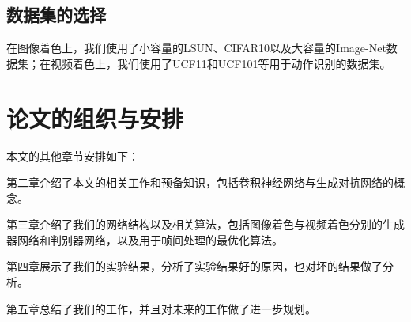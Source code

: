 \subsection{数据集的选择}
\label{sec:dataset}

  在图像着色上，我们使用了小容量的LSUN、CIFAR10以及大容量的Image-Net数据集；在视频着色上，我们使用了UCF11和UCF101等用于动作识别的数据集。

\section{论文的组织与安排}
\label{sec:org}

  本文的其他章节安排如下：

  第二章介绍了本文的相关工作和预备知识，包括卷积神经网络与生成对抗网络的概念。

  第三章介绍了我们的网络结构以及相关算法，包括图像着色与视频着色分别的生成器网络和判别器网络，以及用于帧间处理的最优化算法。

  第四章展示了我们的实验结果，分析了实验结果好的原因，也对坏的结果做了分析。

  第五章总结了我们的工作，并且对未来的工作做了进一步规划。